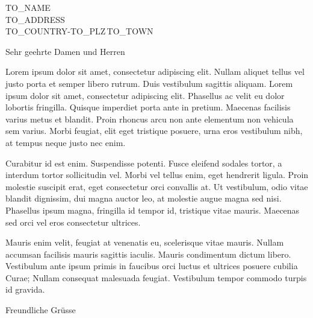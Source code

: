 \documentclass[
	parskip=half,
	fromalign=left,
	foldmarks=true
]{scrlttr2}
\newcommand{\toName}{TO_NAME}
\newcommand{\toAddress}{TO_ADDRESS}
\newcommand{\toCountry}{TO_COUNTRY}
\newcommand{\toPLZ}{TO_PLZ}
\newcommand{\toTown}{TO_TOWN}
\begin{document}
\begin{letter}{\toName \\ \toAddress \\ \toCountry-\toPLZ\,\toTown}

\opening{Sehr geehrte Damen und Herren}

Lorem ipsum dolor sit amet, consectetur adipiscing elit. Nullam aliquet tellus vel justo porta et semper libero rutrum. Duis vestibulum sagittis aliquam. Lorem ipsum dolor sit amet, consectetur adipiscing elit. Phasellus ac velit eu dolor lobortis fringilla. Quisque imperdiet porta ante in pretium. Maecenas facilisis varius metus et blandit. Proin rhoncus arcu non ante elementum non vehicula sem varius. Morbi feugiat, elit eget tristique posuere, urna eros vestibulum nibh, at tempus neque justo nec enim.

Curabitur id est enim. Suspendisse potenti. Fusce eleifend sodales tortor, a interdum tortor sollicitudin vel. Morbi vel tellus enim, eget hendrerit ligula. Proin molestie suscipit erat, eget consectetur orci convallis at. Ut vestibulum, odio vitae blandit dignissim, dui magna auctor leo, at molestie augue magna sed nisi. Phasellus ipsum magna, fringilla id tempor id, tristique vitae mauris. Maecenas sed orci vel eros consectetur ultrices.

Mauris enim velit, feugiat at venenatis eu, scelerisque vitae mauris. Nullam accumsan facilisis mauris sagittis iaculis. Mauris condimentum dictum libero. Vestibulum ante ipsum primis in faucibus orci luctus et ultrices posuere cubilia Curae; Nullam consequat malesuada feugiat. Vestibulum tempor commodo turpis id gravida.

\closing{Freundliche Grüsse}

\end{letter}
\end{document}
